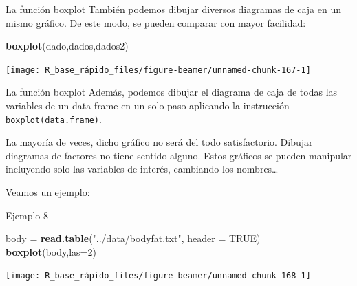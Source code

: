 \documentclass[
  ignorenonframetext,
  aspectratio=169]{beamer}
\newenvironment{Shaded}{\begin{snugshade}}{\end{snugshade}}
\newcommand{\AttributeTok}[1]{\textcolor[rgb]{0.13,0.29,0.53}{#1}}
\newcommand{\ConstantTok}[1]{\textcolor[rgb]{0.56,0.35,0.01}{#1}}
\newcommand{\DecValTok}[1]{\textcolor[rgb]{0.00,0.00,0.81}{#1}}
\newcommand{\FunctionTok}[1]{\textcolor[rgb]{0.13,0.29,0.53}{\textbf{#1}}}
\newcommand{\NormalTok}[1]{#1}
\newcommand{\OtherTok}[1]{\textcolor[rgb]{0.56,0.35,0.01}{#1}}
\newcommand{\StringTok}[1]{\textcolor[rgb]{0.31,0.60,0.02}{#1}}
\begin{document}
\begin{frame}[fragile]{La función boxplot}
\label{la-funciuxf3n-boxplot-1}
También podemos dibujar diversos diagramas de caja en un mismo gráfico.
De este modo, se pueden comparar con mayor facilidad:

\begin{Shaded}
\begin{Highlighting}[]
\FunctionTok{boxplot}\NormalTok{(dado,dados,dados2)}
\end{Highlighting}
\end{Shaded}

\begin{center}\texttt{[image: R\_base\_rápido\_files/figure-beamer/unnamed-chunk-167-1]} \end{center}
\end{frame}

\begin{frame}[fragile]{La función boxplot}
\label{la-funciuxf3n-boxplot-2}
Además, podemos dibujar el diagrama de caja de todas las variables de un
data frame en un solo paso aplicando la instrucción
\texttt{boxplot(data.frame)}.

La mayoría de veces, dicho gráfico no será del todo satisfactorio.
Dibujar diagramas de factores no tiene sentido alguno. Estos gráficos se
pueden manipular incluyendo solo las variables de interés, cambiando los
nombres\ldots{}

Veamos un ejemplo:
\end{frame}

\begin{frame}[fragile]{Ejemplo 8}
\label{ejemplo-8}
\begin{Shaded}
\begin{Highlighting}[]
\NormalTok{body }\OtherTok{=} \FunctionTok{read.table}\NormalTok{(}\StringTok{"../data/bodyfat.txt"}\NormalTok{, }\AttributeTok{header =} \ConstantTok{TRUE}\NormalTok{)}
\FunctionTok{boxplot}\NormalTok{(body,}\AttributeTok{las=}\DecValTok{2}\NormalTok{)}
\end{Highlighting}
\end{Shaded}

\begin{center}\texttt{[image: R\_base\_rápido\_files/figure-beamer/unnamed-chunk-168-1]} \end{center}
\end{frame}
\end{document}

